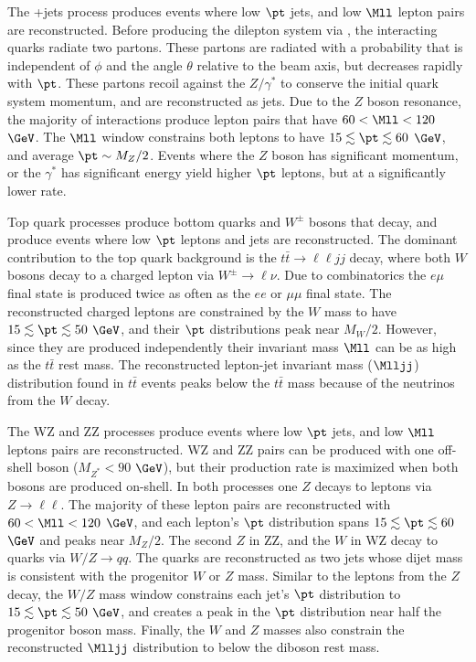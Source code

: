 The \DY+jets process produces events where low $\pt$ jets, and low $\Mll$ lepton pairs are reconstructed.  Before 
producing the dilepton system via \DY, the interacting quarks radiate two partons.  These partons are radiated with a 
probability that is independent of $\phi$ and the angle $\theta$ relative to the beam axis, but decreases rapidly with $\pt$.  These 
partons recoil against the $Z/\gamma^{*}$ to conserve the initial quark system momentum, and are reconstructed as jets.  Due to 
the $Z$ boson resonance, the majority of \DY interactions produce lepton pairs that have $60 < \Mll < 120$ $\GeV$.  The $\Mll$ window 
constrains both leptons to have $15 \lesssim \pt \lesssim 60$ $\GeV$, and average $\pt \sim M_{Z}/2$.  Events where 
the $Z$ boson has significant momentum, or the $\gamma^{*}$ has significant energy yield higher $\pt$ leptons, but at a significantly 
lower rate.

Top quark processes produce bottom quarks and $W^{\pm}$ bosons that decay, and produce events where low $\pt$ leptons and jets 
are reconstructed.  The dominant contribution to the top quark background is the $t\bar{t} \rightarrow \ell\ell jj$ decay, where 
both $W$ bosons decay to a charged lepton via $W^{\pm} \rightarrow \ell\nu$.  Due to combinatorics the $e\mu$ final state 
is produced twice as often as the $ee$ or $\mu\mu$ final state.  The reconstructed charged leptons are constrained by the $W$ mass to 
have $15 \lesssim \pt \lesssim 50$ $\GeV$, and their $\pt$ distributions peak near $M_{W}/2$.  However, since they are produced 
independently their invariant mass $\Mll$ can be as high as the $t\bar{t}$ rest mass.  The reconstructed lepton-jet invariant mass 
($\Mlljj$) distribution found in $t\bar{t}$ events peaks below the $t\bar{t}$ mass because of the neutrinos from the $W$ decay.

The WZ and ZZ processes produce events where low $\pt$ jets, and low $\Mll$ leptons pairs are reconstructed.  WZ and ZZ pairs can be 
produced with one off-shell boson ($M_{Z^{*}} < 90$ $\GeV$), but their production rate is maximized when both bosons are 
produced on-shell.  In both processes one $Z$ decays to leptons via $Z \rightarrow \ell\ell$.  The majority of these lepton pairs are 
reconstructed with $60 < \Mll < 120$ $\GeV$, and each lepton's $\pt$ distribution spans $15 \lesssim \pt \lesssim 60$ $\GeV$ and peaks 
near $M_{Z}/2$.  The second $Z$ in ZZ, and the $W$ in WZ decay to quarks via $W/Z \rightarrow qq$.  The quarks are reconstructed as 
two jets whose dijet mass is consistent with the progenitor $W$ or $Z$ mass.  Similar to the leptons from the $Z$ decay, the $W/Z$ mass 
window constrains each jet's $\pt$ distribution to $15 \lesssim \pt \lesssim 50$ $\GeV$, and creates a peak in the $\pt$ distribution 
near half the progenitor boson mass.  Finally, the $W$ and $Z$ masses also constrain the reconstructed $\Mlljj$ distribution to below 
the diboson rest mass.

